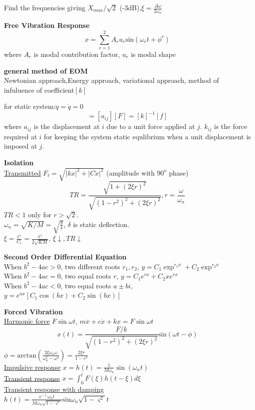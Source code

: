 \documentclass{article}
\begin{document}
\begin{multicols}{3}
Find the frequencies giving $X_{max}/\sqrt{2}$ (-3dB),$\xi =\frac{\Delta \omega}{2\omega_n}$

\noindent\textbf{Free Vibration Response}\\
\begin{equation*}
  {x}=\sum_{r=1}^{2}A_{r}u_{r}\text{sin}(\omega_{r}t+\phi^{r})
\end{equation*}
where $A_{r}$ is modal contribution factor, $u_{r}$ is modal shape

\noindent\textbf{general method of EOM}\\
Newtonian approach,Energy approach, variational approach,
method of infuluence of coefficient$[k]$

for static system:$\ddot{q}=\dot{q}=0$
\begin{equation*}
  [q]=[a_{ij}][F]=[k]^{-1}[f]
\end{equation*}
where $a_{ij}$ is the displacement at $i$ due to a unit force applied at $j$.
$k_{ij}$ is the force required at $i$ for keeping the system static equlibrium when a unit displacement is imposed at $j$.

\noindent\textbf{Isolation}\\
\underline{Transmitted} $F_{t}=\sqrt{|kx|^{2}+|C\dot{x}|^{2}}$ (amplitude with $90^{o}$ phase)
\begin{equation*}
  TR=\frac{\sqrt{1+(2\xi r)^{2}}}{\sqrt{(1-r^{2})^{2}+(2\xi r)^{2}}}, r=\frac{\omega}{\omega_{n}}
\end{equation*}
$TR<1$ only for $r> \sqrt{2}$.\\
$\omega_{n}=\sqrt{K/M}=\sqrt{\frac{g}{\delta}}$, $\delta$ is static deflection. \\
$\xi= \frac{C}{C_{c}}=\frac{C}{2\sqrt{KM}}$, $\xi \downarrow, TR \downarrow$

\noindent\textbf{Second Order Differential Equation}\\
 When $b^2 - 4ac > 0$, two different roots $r_1, r_2$, $y = C_1\exp^{r_1 x} + C_2\exp^{r_2 x}$ \\
 When $b^2 - 4ac = 0$, two equal roots $r$, $y = C_1 e^{r x} + C_2 x e^{r x}$\\
 When $b^2 - 4ac < 0$, two equal roots $a \pm bi$, $y = e^{ax} [C_1 \cos(b x) + C_2 \sin(b x)]$

\noindent\textbf{Forced Vibration}\\
\underline{Harmonic force} $F\sin\omega t$, $m\ddot{x} + c\dot{x} + kx = F\sin\omega t$
\begin{equation*}
  x(t)=\frac{F/k}{\sqrt{(1-r^{2})^{2}+(2\xi r)^{2}}}\text{sin}(\omega t-\phi)
\end{equation*}
$\phi=\text{arctan}(\frac{2 \xi \omega_{n}\omega}{\omega_{n}^{2}-\omega^{2}})=\frac{2\xi r}{1-r^{2}}$\\
\underline{Impulsive response} $x=h(t) = \frac{1}{M\omega_n}\sin(\omega_n t)$\\
\underline{Transient response}  $x = \int_0^t F(\xi) h(t-\xi) d\xi$\\
\underline{Transient response with damping}\\
$h(t)=\frac{e^{-\varsigma}\omega_{n}t}{M\omega_{n}\sqrt{1-\varsigma^{2}}}\text{sin}\omega_{n}\sqrt{1-\varsigma^{2}}t$


\end{multicols}
\end{document}
